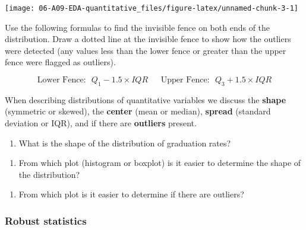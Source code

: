 \documentclass[
]{report}
\providecommand{\tightlist}{%
  \setlength{\itemsep}{0pt}\setlength{\parskip}{0pt}}
\begin{document}
\begin{center}\texttt{[image: 06-A09-EDA-quantitative\_files/figure-latex/unnamed-chunk-3-1]} \end{center}

Use the following formulas to find the invisible fence on both ends of the distribution. Draw a dotted line at the invisible fence to show how the outliers were detected (any values less than the lower fence or greater than the upper fence were flagged as outliers).

\[\text{Lower Fence:} ~~~ Q_1 - 1.5\times IQR~~~~~~~\text{Upper Fence:} ~~~ Q_3 + 1.5\times IQR\]
\vspace{0.1in}

When describing distributions of quantitative variables we discuss the \textbf{shape} (symmetric or skewed), the \textbf{center} (mean or median), \textbf{spread} (standard deviation or IQR), and if there are \textbf{outliers} present.

\begin{enumerate}
\def\labelenumi{\arabic{enumi}.}
\setcounter{enumi}{1}
\tightlist
\item
  What is the shape of the distribution of graduation rates?
\end{enumerate}

\vspace{0.4in}

\begin{enumerate}
\def\labelenumi{\arabic{enumi}.}
\setcounter{enumi}{2}
\tightlist
\item
  From which plot (histogram or boxplot) is it easier to determine the shape of the distribution?
\end{enumerate}

\vspace{0.3in}

\begin{enumerate}
\def\labelenumi{\arabic{enumi}.}
\setcounter{enumi}{3}
\tightlist
\item
  From which plot is it easier to determine if there are outliers?
\end{enumerate}

\vspace{0.3in}

\subsubsection*{Robust statistics}\label{robust-statistics}
\end{document}
